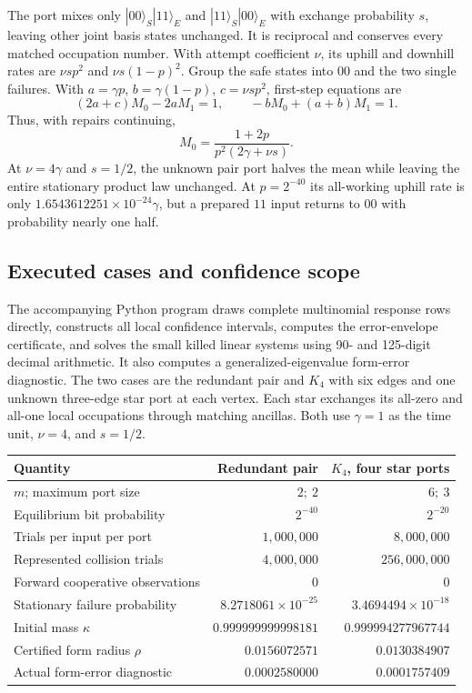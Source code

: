\documentclass[10pt,a4paper]{article}
\theoremstyle{definition}\newtheorem{assumption}[theorem]{Assumption}
\begin{document}
The port mixes only
$|00\rangle_S|11\rangle_E$ and $|11\rangle_S|00\rangle_E$
with exchange probability $s$, leaving other joint basis states unchanged. It is reciprocal and conserves every matched occupation number. With attempt coefficient $\nu$, its uphill and downhill rates are $\nu s p^2$ and $\nu s(1-p)^2$. Group the safe states into $00$ and the two single failures. With $a=\gamma p$, $b=\gamma(1-p)$, $c=\nu s p^2$, first-step equations are
\[
 (2a+c)M_0-2aM_1=1,\qquad
 -bM_0+(a+b)M_1=1.
\]
Thus, with repairs continuing,
\begin{equation}
 M_0=\frac{1+2p}{p^2(2\gamma+\nu s)}.
 \label{eq:twobit}
\end{equation}
At $\nu=4\gamma$ and $s=1/2$, the unknown pair port halves the mean while leaving the entire stationary product law unchanged. At $p=2^{-40}$ its all-working uphill rate is only $1.6543612251\times10^{-24}\gamma$, but a prepared $11$ input returns to $00$ with probability nearly one half.

\subsection{Executed cases and confidence scope}

The accompanying Python program draws complete multinomial response rows directly, constructs all local confidence intervals, computes the error-envelope certificate, and solves the small killed linear systems using 90- and 125-digit decimal arithmetic. It also computes a generalized-eigenvalue form-error diagnostic. The two cases are the redundant pair and $K_4$ with six edges and one unknown three-edge star port at each vertex. Each star exchanges its all-zero and all-one local occupations through matching ancillas. Both use $\gamma=1$ as the time unit, $\nu=4$, and $s=1/2$.

\begin{center}
\small
\begin{tabular}{@{}lrr@{}}
\toprule
Quantity & Redundant pair & $K_4$, four star ports\\
\midrule
$m$; maximum port size & $2;\ 2$ & $6;\ 3$\\
Equilibrium bit probability & $2^{-40}$ & $2^{-20}$\\
Trials per input per port & $1{,}000{,}000$ & $8{,}000{,}000$\\
Represented collision trials & $4{,}000{,}000$ & $256{,}000{,}000$\\
Forward cooperative observations & $0$ & $0$\\
Stationary failure probability & $8.2718061\times10^{-25}$ & $3.4694494\times10^{-18}$\\
Initial mass $\kappa$ & $0.999999999998181$ & $0.999994277967744$\\
Certified form radius $\rho$ & $0.0156072571$ & $0.0130384907$\\
Actual form-error diagnostic & $0.0002580000$ & $0.0001757409$\\
\bottomrule
\end{tabular}
\end{center}
\end{document}
